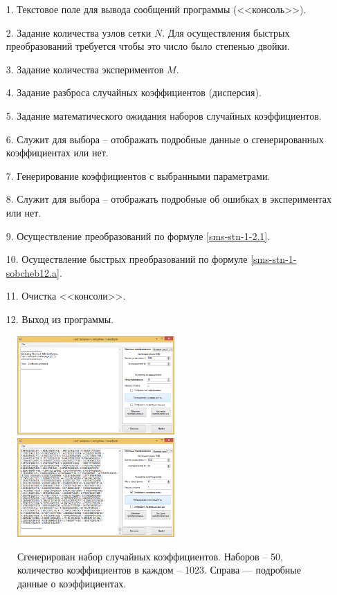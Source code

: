 \begin{enumerate}
	\item[1.] Текстовое поле для вывода сообщений программы (<<консоль>>).
	\item[2.] Задание количества узлов сетки $N$. Для осуществления быстрых преобразований требуется чтобы это число было степенью двойки.
	\item[3.] Задание количества экспериментов $M$.
	\item[4.] Задание разброса случайных коэффициентов (дисперсия).
	\item[5.] Задание математического ожидания наборов случайных коэффициентов.
	\item[6.] Служит для выбора -- отображать подробные данные о сгенерированных коэффициентах или нет.
	\item[7.] Генерирование коэффициентов с выбранными параметрами.
	\item[8.] Служит для выбора -- отображать подробные об ошибках в экспериментах или нет.
	\item[9.] Осуществление преобразований по формуле \eqref{sms-stn-1-2.1}.
	\item[10.] Осуществление быстрых преобразований по формуле \eqref{sms-stn-1-sobcheb12.a}.
	\item[11.] Очистка <<консоли>>.
	\item[12.] Выход из программы.
\end{enumerate}

\begin{figure}[H]
	\begin{center}
		\includegraphics[width=170pt]{pictures/sms-stn-1(2)}
		\quad
		\includegraphics[width=170pt]{pictures/sms-stn-1(3)}
		\caption{
			Сгенерирован набор случайных коэффициентов. Наборов -- 50, количество коэффициентов в каждом -- 1023. Справа --- подробные данные о коэффициентах.
		}\label{sms-stn-1-img2}
	\end{center}
\end{figure}

